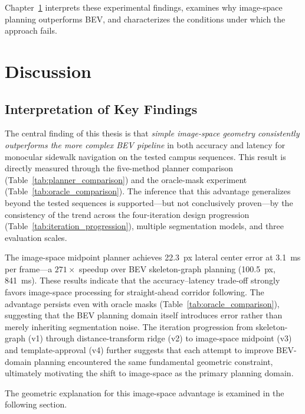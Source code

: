 \documentclass[12pt,letterpaper,oneside]{report}
\begin{document}
Chapter~\ref{ch:discussion} interprets these experimental findings, examines why image-space planning outperforms BEV, and characterizes the conditions under which the approach fails.


\chapter{Discussion}
\label{ch:discussion}


\section{Interpretation of Key Findings}

The central finding of this thesis is that \emph{simple image-space geometry consistently outperforms the more complex BEV pipeline} in both accuracy and latency for monocular sidewalk navigation on the tested campus sequences.  This result is directly measured through the five-method planner comparison (Table~\ref{tab:planner_comparison}) and the oracle-mask experiment (Table~\ref{tab:oracle_comparison}).  The inference that this advantage generalizes beyond the tested sequences is supported---but not conclusively proven---by the consistency of the trend across the four-iteration design progression (Table~\ref{tab:iteration_progression}), multiple segmentation models, and three evaluation scales.

The image-space midpoint planner achieves 22.3~px lateral center error at 3.1~ms per frame---a $271\times$ speedup over BEV skeleton-graph planning (100.5~px, 841~ms).  These results indicate that the accuracy--latency trade-off strongly favors image-space processing for straight-ahead corridor following.  The advantage persists even with oracle masks (Table~\ref{tab:oracle_comparison}), suggesting that the BEV planning domain itself introduces error rather than merely inheriting segmentation noise.  The iteration progression from skeleton-graph (v1) through distance-transform ridge (v2) to image-space midpoint (v3) and template-approval (v4) further suggests that each attempt to improve BEV-domain planning encountered the same fundamental geometric constraint, ultimately motivating the shift to image-space as the primary planning domain.

The geometric explanation for this image-space advantage is examined in the following section.
\end{document}
